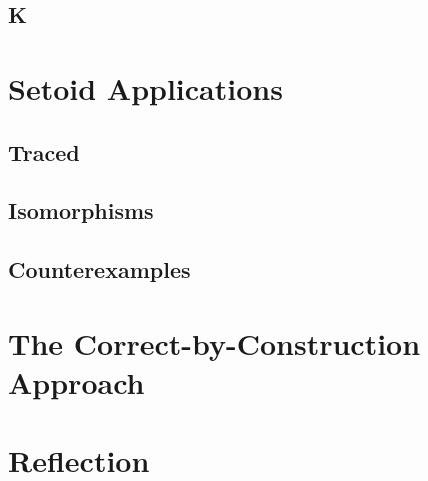 \documentclass[draft, twocolumn]{article}
\begin{document}
\subsection{K}
\section{Setoid Applications}
\subsection{Traced}
\subsection{Isomorphisms}
\subsection{Counterexamples}
\section{The Correct-by-Construction Approach}
\section{Reflection}


\end{document}
